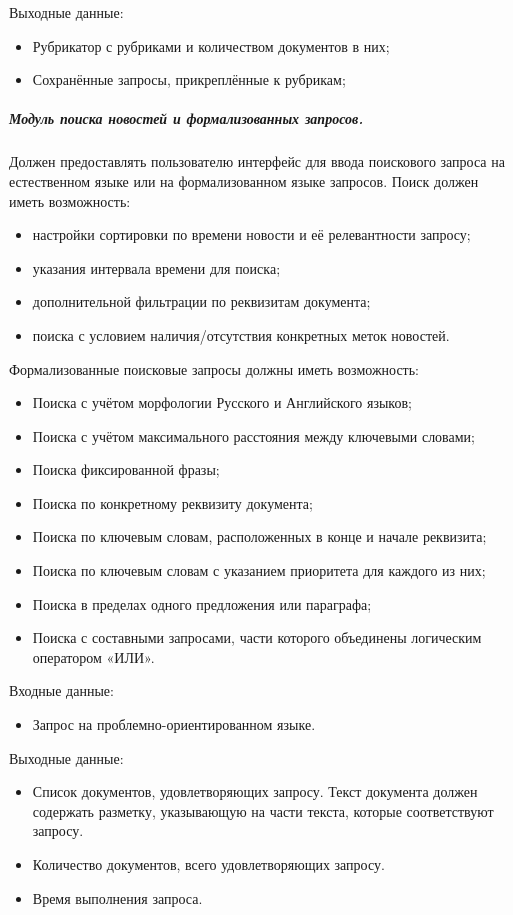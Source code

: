 Выходные данные:
\begin{itemize}
\item Рубрикатор с рубриками и количеством документов в них;
\item Сохранённые запросы, прикреплённые к рубрикам;
\end{itemize}

\subparagraph{Модуль поиска новостей и формализованных запросов.}  \hfill

Должен предоставлять пользователю интерфейс для ввода поискового запроса на
естественном языке или на формализованном языке запросов. Поиск должен
иметь возможность:
\begin{itemize}
\item настройки сортировки по времени новости и её релевантности запросу;
\item указания интервала времени для поиска;
\item дополнительной фильтрации по реквизитам документа;
\item поиска с условием наличия/отсутствия конкретных меток новостей.
\end{itemize}

Формализованные поисковые запросы должны иметь возможность:
\begin{itemize}
\item Поиска с учётом морфологии Русского и Английского языков;
\item Поиска с учётом максимального расстояния между ключевыми словами;
\item Поиска фиксированной фразы;
\item Поиска по конкретному реквизиту документа;
\item Поиска по ключевым словам, расположенных в конце и начале реквизита;
\item Поиска по ключевым словам с указанием приоритета для каждого из них;
\item Поиска в пределах одного предложения или параграфа;
\item Поиска с составными запросами, части которого объединены логическим оператором «ИЛИ».
\end{itemize}

Входные данные:
\begin{itemize}
\item Запрос на проблемно-ориентированном языке.
\end{itemize}

Выходные данные:
\begin{itemize}
\item Список документов, удовлетворяющих запросу. Текст документа должен содержать разметку, указывающую на части текста, которые соответствуют запросу.
\item Количество документов, всего удовлетворяющих запросу.
\item Время выполнения запроса.
\end{itemize}

